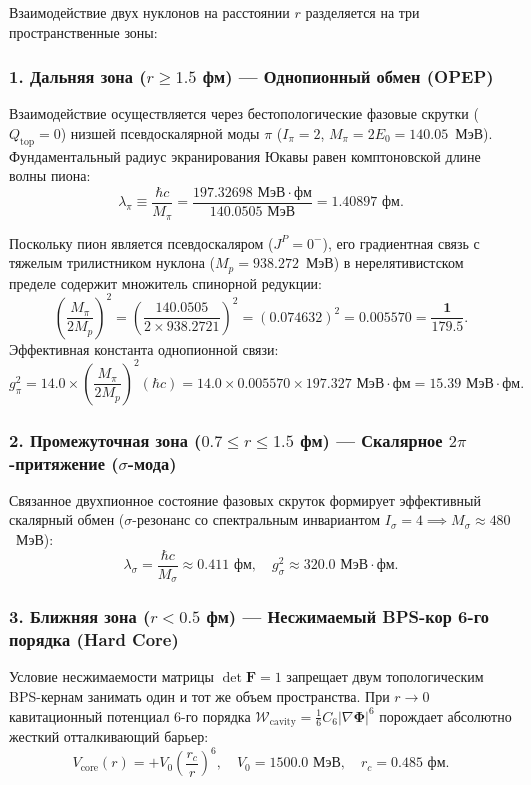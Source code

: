 \documentclass[11pt,a4paper,oneside]{article}
\theoremstyle{plain}
\theoremstyle{definition}
\theoremstyle{remark}
\numberwithin{equation}{section}
\begin{document}
Взаимодействие двух нуклонов на расстоянии $r$ разделяется на три пространственные зоны:

\subsubsection{1. Дальняя зона ($r \ge 1.5$ фм) --- Однопионный обмен (OPEP)}
Взаимодействие осуществляется через бестопологические фазовые скрутки ($Q_{\text{top}} = 0$) низшей псевдоскалярной моды $\pi$ ($I_\pi = 2$, $M_\pi = 2E_0 = 140.05$~МэВ).
Фундаментальный радиус экранирования Юкавы равен комптоновской длине волны пиона:
\begin{equation}
	\lambda_\pi \equiv \frac{\hbar c}{M_\pi} = \frac{197.32698 \text{ МэВ}\cdot\text{фм}}{140.0505 \text{ МэВ}} = \mathbf{1.40897 \text{ фм}}.
\end{equation}

Поскольку пион является псевдоскаляром ($J^P = 0^-$), его градиентная связь с тяжелым трилистником нуклона ($M_p = 938.272$~МэВ) в нерелятивистском пределе содержит множитель спинорной редукции:
\begin{equation}
	\left( \frac{M_\pi}{2 M_p} \right)^2 = \left( \frac{140.0505}{2 \times 938.2721} \right)^2 = (0.074632)^2 = \mathbf{0.005570 = \frac{1}{179.5}}.
\end{equation}
Эффективная константа однопионной связи:
\begin{equation}
	g_\pi^2 = 14.0 \times \left(\frac{M_\pi}{2 M_p}\right)^2 (\hbar c) = 14.0 \times 0.005570 \times 197.327 \text{ МэВ}\cdot\text{фм} = \mathbf{15.39 \text{ МэВ}\cdot\text{фм}}.
\end{equation}

\subsubsection{2. Промежуточная зона ($0.7 \le r \le 1.5$ фм) --- Скалярное $2\pi$-притяжение ($\sigma$-мода)}
Связанное двухпионное состояние фазовых скруток формирует эффективный скалярный обмен ($\sigma$-резонанс со спектральным инвариантом $I_\sigma = 4 \implies M_\sigma \approx 480$~МэВ):
\begin{equation}
	\lambda_\sigma = \frac{\hbar c}{M_\sigma} \approx 0.411 \text{ фм}, \quad g_\sigma^2 \approx 320.0 \text{ МэВ}\cdot\text{фм}.
\end{equation}

\subsubsection{3. Ближняя зона ($r < 0.5$ фм) --- Несжимаемый BPS-кор 6-го порядка (Hard Core)}
Условие несжимаемости матрицы $\det\mathbf{F}=1$ запрещает двум топологическим BPS-кернам занимать один и тот же объем пространства. При $r \to 0$ кавитационный потенциал 6-го порядка $\mathcal{W}_{\text{cavity}} = \frac{1}{6}C_6 |\nabla\boldsymbol{\Phi}|^6$ порождает абсолютно жесткий отталкивающий барьер:
\begin{equation}
	V_{\text{core}}(r) = + V_0 \left( \frac{r_c}{r} \right)^6, \quad V_0 = 1500.0 \text{ МэВ}, \quad r_c = 0.485 \text{ фм}.
\end{equation}
\end{document}
